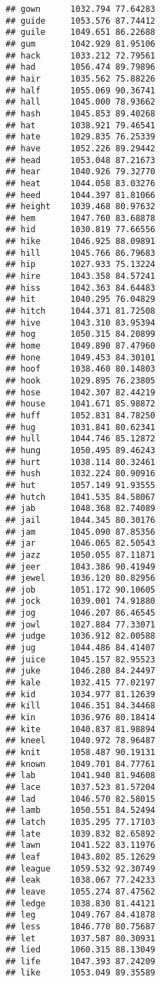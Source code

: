 \documentclass[
]{article}
\begin{document}
\begin{verbatim}
## gown      1032.794 77.64283
## guide     1053.576 87.74412
## guile     1049.651 86.22688
## gum       1042.929 81.95106
## hack      1033.212 72.79561
## had       1056.474 89.79896
## hair      1035.562 75.88226
## half      1055.069 90.36741
## hall      1045.000 78.93662
## hash      1045.853 89.40268
## hat       1038.921 79.46541
## hate      1029.835 76.25339
## have      1052.226 89.29442
## head      1053.048 87.21673
## hear      1040.926 79.32770
## heat      1044.058 83.03276
## heed      1044.397 81.81066
## height    1039.468 80.97632
## hem       1047.760 83.68878
## hid       1030.819 77.66556
## hike      1046.925 88.09891
## hill      1045.766 86.79683
## hip       1027.933 75.13224
## hire      1043.358 84.57241
## hiss      1042.363 84.64483
## hit       1040.295 76.04829
## hitch     1044.371 81.72508
## hive      1043.310 83.95394
## hog       1050.315 84.20899
## home      1049.890 87.47960
## hone      1049.453 84.30101
## hoof      1038.460 80.14803
## hook      1029.895 76.23805
## hose      1042.307 82.44219
## house     1041.671 85.98872
## huff      1052.831 84.78250
## hug       1031.841 80.62341
## hull      1044.746 85.12872
## hung      1050.495 89.46243
## hurt      1038.114 80.32461
## hush      1032.224 80.90916
## hut       1057.149 91.93555
## hutch     1041.535 84.58067
## jab       1048.368 82.74089
## jail      1044.345 80.30176
## jam       1045.090 87.85356
## jar       1046.065 82.50543
## jazz      1050.055 87.11871
## jeer      1043.386 90.41949
## jewel     1036.120 80.82956
## job       1051.172 90.10605
## jock      1039.001 74.91880
## jog       1046.207 86.46545
## jowl      1027.884 77.33071
## judge     1036.912 82.00588
## jug       1044.486 84.41407
## juice     1045.157 82.95523
## juke      1046.280 84.24497
## kale      1032.415 77.02197
## kid       1034.977 81.12639
## kill      1046.351 84.34468
## kin       1036.976 80.18414
## kite      1040.837 81.98894
## kneel     1040.972 78.96487
## knit      1058.487 90.19131
## known     1049.701 84.77761
## lab       1041.940 81.94608
## lace      1037.523 81.57204
## lad       1046.570 82.58015
## lamb      1050.551 84.52494
## latch     1035.295 77.17103
## late      1039.832 82.65892
## lawn      1041.522 83.11976
## leaf      1043.802 85.12629
## league    1059.532 92.30749
## leak      1038.067 77.24233
## leave     1055.274 87.47562
## ledge     1038.830 81.44121
## leg       1049.767 84.41878
## less      1046.770 80.75687
## let       1037.587 80.30931
## lied      1060.315 88.13049
## life      1047.393 87.24209
## like      1053.049 89.35589

\end{verbatim}
\end{document}
